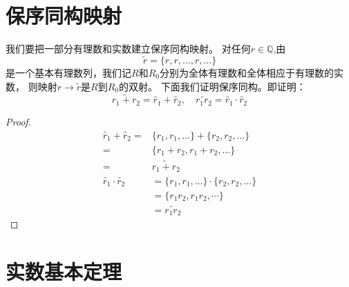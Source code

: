 \documentclass[12pt, a4paper, oneside]{ctexart}
\newcommand{\bol}{\widetilde}
\begin{document}
\section{保序同构映射}
我们要把一部分有理数和实数建立保序同构映射。
对任何$r \in \mathbb{Q}$,由
\begin{equation*}
    \bol{r}=\{ r,r,\dots,r,\dots \}
\end{equation*}
是一个基本有理数列，我们记$R$和$R_{0}$分别为全体有理数和全体相应于有理数的实数，
则映射$r \rightarrow \bol{r}$是$R$到$R_{0}$的双射。
下面我们证明保序同构。即证明：
\begin{equation*}
    \bol{r_{1}+r_{2}}=\bol{r_{1}}+\bol{r_{2}},\quad\bol{r_{1}r_{2}}=\bol{r_{1}}\cdot  \bol{r_{2}}
\end{equation*}
\begin{proof}
    \begin{align*}
        \bol{r_{1}}+\bol{r_{2}}=      & \{ r_{1},r_{1},\dots\}+\{ r_{2},r_{2},\dots\}       \\
        =                             & \{ r_{1}+r_{2},r_{1}+r_{2},\dots\}                  \\
        =                             & \bol{r_{1}+r_{2}}                                   \\
        \bol{r_{1}}\cdot  \bol{r_{2}} & =\{ r_{1},r_{1},\dots\}\cdot \{ r_{2},r_{2},\dots\} \\
                                      & =\{ r_{1}r_{2},r_{1}r_{2}, \cdots \}                \\
                                      & =\bol{r_{1}r_{2}}
    \end{align*}
\end{proof}
\section{实数基本定理}
\end{document}
